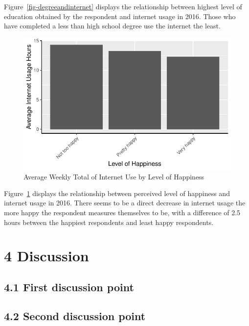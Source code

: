 \documentclass[
  letterpaper,
  DIV=11,
  numbers=noendperiod]{scrartcl}
\begin{document}
Figure~\ref{fig-degreeandinternet} displays the relationship between
highest level of education obtained by the respondent and internet usage
in 2016. Those who have completed a less than high school degree use the
internet the least.

\begin{figure}

{\centering \includegraphics{paper_files/figure-pdf/fig-happyandinternet-1.pdf}

}

\caption{\label{fig-happyandinternet}Average Weekly Total of Internet
Use by Level of Happiness}

\end{figure}

Figure~\ref{fig-happyandinternet} displays the relationship between
perceived level of happiness and internet usage in 2016. There seems to
be a direct decrease in internet usage the more happy the respondent
measures themselves to be, with a difference of 2.5 hours between the
happiest respondents and least happy respondents.

\hypertarget{sec-discussion}{%
\section{4 Discussion}\label{sec-discussion}}

\hypertarget{sec-first-point}{%
\subsection{4.1 First discussion point}\label{sec-first-point}}

\hypertarget{sec-second-point}{%
\subsection{4.2 Second discussion point}\label{sec-second-point}}
\end{document}
